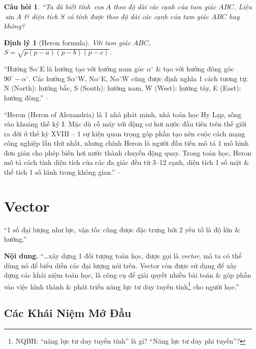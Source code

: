 \documentclass{article}
\numberwithin{equation}{section}
\newtheorem{theorem}{Định lý}[section]
\newtheorem{question}{Câu hỏi}[section]
\begin{document}
\begin{question}
	``Ta đã biết tính $\cos A$ theo độ dài các cạnh của tam giác $ABC$. Liệu $\sin A$ \& diện tích $S$ có tính được theo độ dài các cạnh của tam giác $ABC$ hay không?
\end{question}

\begin{theorem}[Heron formula]
	Với tam giác $ABC$, $S = \sqrt{p(p - a)(p - b)(p - c)}$.
\end{theorem}
``Hướng S$\alpha^\circ$E là hướng tạo với hướng nam góc $\alpha^\circ$ \& tạo với hướng đông góc $90^\circ - \alpha^\circ$. Các hướng S$\alpha^\circ$W, N$\alpha^\circ$E, N$\alpha^\circ$W cũng được định nghĩa 1 cách tương tự. N (North): hướng bắc, S (South): hướng nam, W (West): hướng tây, E (East): hướng đông.'' -- \cite[p. 42]{Khoai_Anh_Tan_Thang_Anh_Cuong_Duong_Dang_Ha_Hanh_Hong_Son_Tuan_Vuong_Toan_10_tap_1}

``Heron (Heron of Alexandria) là 1 nhà phát minh, nhà toán học Hy Lạp, sống vào khoảng thế kỷ I. Mặc dù cỗ máy với động cơ hơi nước đầu tiên trên thế giới ra đời ở thế kỷ XVIII -- 1 sự kiện quan trọng góp phần tạo nên cuộc cách mạng công nghiệp lần thứ nhất, nhưng chính Heron là người đầu tiên mô tả 1 mô hình đơn giản cho phép biến hơi nước thành chuyển động quay. Trong toán học, Heron mô tả cách tính diện tích của các đa giác đều từ 3--12 cạnh, diện tích 1 số mặt \& thể tích 1 số hình trong không gian.'' -- \cite[p. 43]{Khoai_Anh_Tan_Thang_Anh_Cuong_Duong_Dang_Ha_Hanh_Hong_Son_Tuan_Vuong_Toan_10_tap_1}


\section{Vector}
``1 số đại lượng như lực, vận tốc cũng được đặc trưng bởi 2 yếu tố là độ lớn \& hướng.''

\noindent\textbf{Nội dung.} ``\ldots xây dựng 1 đối tượng toán học, được gọi là \textit{vector}, mà ta có thể dùng nó để biểu diễn các đại lượng nói trên. Vector còn được sử dụng để xây dựng các khái niệm toán học, là công cụ để giải quyết nhiều bài toán \& góp phần vào việc hình thành \& phát triển năng lực tư duy tuyến tính\footnote{NQBH: ``năng lực tư duy tuyến tính'' là gì? ``Năng lực tư duy phi tuyến''?} cho người học.''

\subsection{Các Khái Niệm Mở Đầu}
\end{document}
